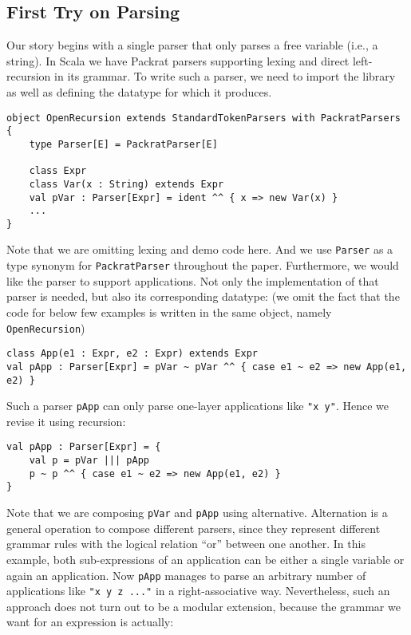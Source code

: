 \subsection{First Try on Parsing}\label{subsec:firsttry}

Our story begins with a single parser that only parses a free variable (i.e., a string).
In Scala we have Packrat parsers supporting lexing and direct left-recursion in its grammar.
To write such a parser, we need to import the library as
well as defining the datatype for which it produces.

\begin{lstlisting}
object OpenRecursion extends StandardTokenParsers with PackratParsers {
    type Parser[E] = PackratParser[E]

    class Expr
    class Var(x : String) extends Expr
    val pVar : Parser[Expr] = ident ^^ { x => new Var(x) }
    ...
}
\end{lstlisting}
Note that we are omitting lexing and demo code here. And we use \lstinline{Parser} as a type synonym for \lstinline{PackratParser} throughout the paper. Furthermore, we would like the parser to support applications.
Not only the implementation of that parser is needed, but also its corresponding datatype: (we omit the fact that the code for below few
examples is written in the same object, namely \lstinline{OpenRecursion})
\begin{lstlisting}
class App(e1 : Expr, e2 : Expr) extends Expr
val pApp : Parser[Expr] = pVar ~ pVar ^^ { case e1 ~ e2 => new App(e1, e2) }
\end{lstlisting}
Such a parser \lstinline{pApp} can only parse one-layer applications like \lstinline{"x y"}. Hence we revise it using recursion:
\begin{lstlisting}
val pApp : Parser[Expr] = {
    val p = pVar ||| pApp
    p ~ p ^^ { case e1 ~ e2 => new App(e1, e2) }
}
\end{lstlisting}
Note that we are composing \lstinline{pVar} and \lstinline{pApp} using alternative. Alternation is a general operation to compose different parsers, since they represent different grammar rules with the logical relation ``or'' between one another. In this example, both sub-expressions of an application can be either a single variable or again an application. Now \lstinline{pApp} manages to parse an arbitrary number of applications like \lstinline{"x y z ..."} in a right-associative way.
Nevertheless, such an approach does not turn out to be a modular extension, because the grammar we want for an expression is actually:
